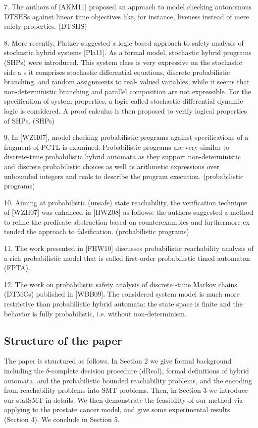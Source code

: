 \documentclass[runningheads,a4paper]{llncs}
\begin{document}
7. The authors of [AKM11] proposed an approach to model checking autonomous DTSHSs against linear time objectives like, for instance, liveness instead of mere safety properties. (DTSHS)

8. More recently, Platzer suggested a logic-based approach to safety analysis of stochastic hybrid systems [Pla11]. As a formal model, stochastic hybrid programs (SHPs) were introduced. This system class is very expressive on the stochastic side a s it comprises stochastic differential equations, discrete probabilistic branching, and random assignments to real- valued variables, while it seems that non-deterministic branching and parallel composition are not expressible. For the specification of system properties, a logic called stochastic differential dynamic logic is considered. A proof calculus is then proposed to verify logical properties of SHPs.  (SHPs)

9. In [WZH07], model checking probabilistic programs against specifications of a fragment of PCTL is examined. Probabilistic programs are very similar to discrete-time probabilistic hybrid automata as they support non-deterministic and discrete probabilistic choices as well as arithmetic expressions over unbounded integers and reals to describe the program execution. (probabilistic programs)

10. Aiming at probabilistic (unsafe) state reachability, the verification technique of [WZH07] was enhanced in [HWZ08] as follows: the authors suggested a method to refine the predicate abstraction based on counterexamples and furthermore ex tended the approach to falsification. (probabilistic programs)

11. The work presented in [FHW10] discusses probabilistic reachability analysis of a rich probabilistic model that is called first-order probabilistic timed automaton (FPTA). 

12. The work on probabilistic safety analysis of discrete -time Markov chains (DTMCs) published in [WBB09]. The considered system model is much more restrictive than probabilistic hybrid automata: the state space is finite and the behavior is fully probabilistic, i.e. without non-determinism. 

\subsection{Structure of the paper}


The paper is structured as follows. In Section 2 we give formal background including the $\delta$-complete decision procedure (dReal), formal definitions of hybrid automata, and the probabilistic bounded reachability problems, and the encoding from reachability problems into SMT problems. Then, in Section 3 we introduce our statSMT in details. We then demonstrate the feasibility of our method via applying to the prostate cancer model, and give some experimental results (Section 4). We conclude in Section 5.
\end{document}
